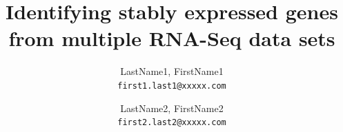 \documentclass[letterpaper,12pt]{article}
\title{Identifying stably expressed genes from multiple RNA-Seq data sets}
\date{} %
\begin{document}
	
	
	\author{
		LastName1, FirstName1\\
		\texttt{first1.last1@xxxxx.com}
		\and
		LastName2, FirstName2\\
		\texttt{first2.last2@xxxxx.com}
	}

%
%
%
\end{document}
